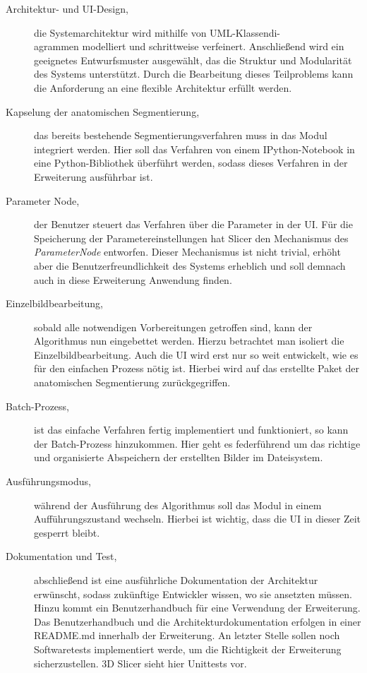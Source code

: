 \begin{description}
	\item[Architektur- und \ac{UI}-Design,] die Systemarchitektur wird mithilfe von
		\ac{UML}-Klassendi-\\agrammen modelliert und schrittweise verfeinert.
		Anschließend wird ein geeignetes Entwurfsmuster ausgewählt, das die Struktur
		und Modularität des Systems unterstützt. Durch die Bearbeitung dieses
		Teilproblems kann die Anforderung an eine flexible Architektur erfüllt
		werden.

	\item[Kapselung der anatomischen Segmentierung,] das bereits bestehende Segmentierungsverfahren
		muss in das Modul integriert werden. Hier soll das Verfahren von einem
		IPython-Notebook in eine Python-Bibliothek überführt werden, sodass dieses Verfahren
		in der Erweiterung ausführbar ist.

	\item[Parameter Node,] der Benutzer steuert das Verfahren über die Parameter in
		der \ac{UI}. Für die Speicherung der Parametereinstellungen hat Slicer den Mechanismus
		des \textit{ParameterNode} entworfen. Dieser Mechanismus ist nicht trivial,
		erhöht aber die Benutzerfreundlichkeit des Systems erheblich und soll
		demnach auch in diese Erweiterung Anwendung finden.

	\item[Einzelbildbearbeitung,] sobald alle notwendigen Vorbereitungen getroffen
		sind, kann der Algorithmus nun eingebettet werden. Hierzu betrachtet man isoliert
		die Einzelbildbearbeitung. Auch die \ac{UI} wird erst nur so weit entwickelt,
		wie es für den einfachen Prozess nötig ist. Hierbei wird auf das erstellte Paket
		der anatomischen Segmentierung zurückgegriffen.

	\item[Batch-Prozess,] ist das einfache Verfahren fertig implementiert und funktioniert,
		so kann der Batch-Prozess hinzukommen. Hier geht es federführend um das richtige
		und organisierte Abspeichern der erstellten Bilder im Dateisystem.

	\item[Ausführungsmodus,] während der Ausführung des Algorithmus soll das Modul
		in einem Aufführungszustand wechseln. Hierbei ist wichtig, dass die \ac{UI}
		in dieser Zeit gesperrt bleibt.

	\item[Dokumentation und Test,] abschließend ist eine ausführliche Dokumentation
		der Architektur erwünscht, sodass zukünftige Entwickler wissen, wo sie ansetzten
		müssen. Hinzu kommt ein Benutzerhandbuch für eine Verwendung der Erweiterung.
		Das Benutzerhandbuch und die Architekturdokumentation erfolgen in einer README.md
		innerhalb der Erweiterung. An letzter Stelle sollen noch Softwaretests
		implementiert werde, um die Richtigkeit der Erweiterung sicherzustellen. 3D
		Slicer sieht hier Unittests vor.
\end{description}

